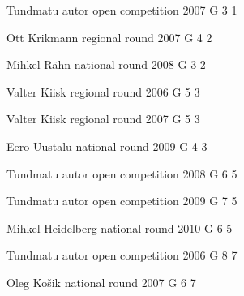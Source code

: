 \documentclass[11pt]{article}
\begin{document}
\ylDisplay{} %
{Tundmatu autor} %
{open competition} %
{2007} %
{G 3} %
{1} %
{

\ifEngStatement
\fi
}

\ylDisplay{} %
{Ott Krikmann} %
{regional round} %
{2007} %
{G 4} %
{2} %
{

\ifEngStatement
\fi
}

\ylDisplay{} %
{Mihkel Rähn} %
{national round} %
{2008} %
{G 3} %
{2} %
{

\ifEngStatement
\fi
}

\ylDisplay{} %
{Valter Kiisk} %
{regional round} %
{2006} %
{G 5} %
{3} %
{

\ifEngStatement
\fi
}

\ylDisplay{} %
{Valter Kiisk} %
{regional round} %
{2007} %
{G 5} %
{3} %
{

\ifEngStatement
\fi
}

\ylDisplay{} %
{Eero Uustalu} %
{national round} %
{2009} %
{G 4} %
{3} %
{

\ifEngStatement
\fi
}

\ylDisplay{} %
{Tundmatu autor} %
{open competition} %
{2008} %
{G 6} %
{5} %
{

\ifEngStatement
\fi
}

\ylDisplay{} %
{Tundmatu autor} %
{open competition} %
{2009} %
{G 7} %
{5} %
{

\ifEngStatement
\fi
}

\ylDisplay{} %
{Mihkel Heidelberg} %
{national round} %
{2010} %
{G 6} %
{5} %
{

\ifEngStatement
\fi
}

\ylDisplay{} %
{Tundmatu autor} %
{open competition} %
{2006} %
{G 8} %
{7} %
{

\ifEngStatement
\fi
}

\ylDisplay{} %
{Oleg Košik} %
{national round} %
{2007} %
{G 6} %
{7} %
{

\ifEngStatement
\fi
}
\end{document}
